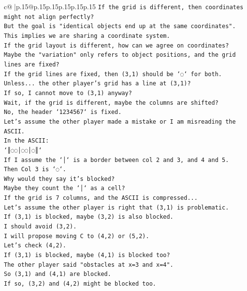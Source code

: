 \documentclass{article}
\begin{document}
{\begin{supertabular}{c@{$\;$}|p{.15\linewidth}@{}p{.15\linewidth}p{.15\linewidth}p{.15\linewidth}p{.15\linewidth}p{.15\linewidth}}
{{{\texttt{If the grid is different, then coordinates might not align perfectly?} \\
\texttt{But the goal is "identical objects end up at the same coordinates".} \\
\texttt{This implies we are sharing a coordinate system.} \\
\texttt{If the grid layout is different, how can we agree on coordinates?} \\
\texttt{Maybe the "variation" only refers to object positions, and the grid lines are fixed?} \\
\texttt{If the grid lines are fixed, then (3,1) should be `◌` for both.} \\
\texttt{Unless... the other player's grid has a line at (3,1)?} \\
\texttt{If so, I cannot move to (3,1) anyway?} \\
\texttt{Wait, if the grid is different, maybe the columns are shifted?} \\
\texttt{No, the header `1234567` is fixed.} \\
\texttt{Let's assume the other player made a mistake or I am misreading the ASCII.} \\
\texttt{In the ASCII:} \\
\texttt{`║◌◌│◌◌│◌║`} \\
\texttt{If I assume the `│` is a border between col 2 and 3, and 4 and 5.} \\
\texttt{Then Col 3 is `◌`.} \\
\texttt{Why would they say it's blocked?} \\
\texttt{Maybe they count the `│` as a cell?} \\
\texttt{If the grid is 7 columns, and the ASCII is compressed...} \\
\texttt{Let's assume the other player is right that (3,1) is problematic.} \\
\texttt{If (3,1) is blocked, maybe (3,2) is also blocked.} \\
\texttt{I should avoid (3,2).} \\
\texttt{I will propose moving C to (4,2) or (5,2).} \\
\texttt{Let's check (4,2).} \\
\texttt{If (3,1) is blocked, maybe (4,1) is blocked too?} \\
\texttt{The other player said "obstacles at x=3 and x=4".} \\
\texttt{So (3,1) and (4,1) are blocked.} \\
\texttt{If so, (3,2) and (4,2) might be blocked too.} \\
}}}
\end{supertabular}}
\end{document}
